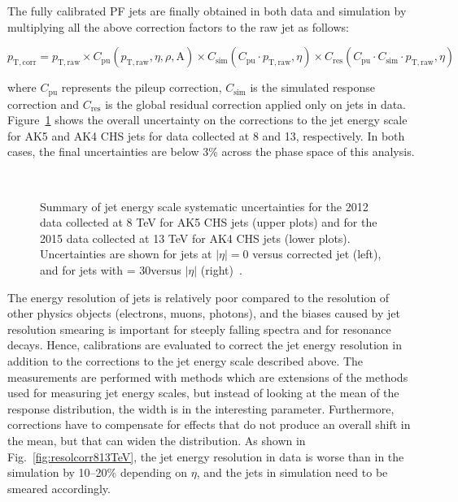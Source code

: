 The fully calibrated PF jets are finally obtained in both data and simulation by multiplying all the above correction factors to the raw jet \pt as follows:

\begin{equation}
p_\mathrm{T,corr} = p_\mathrm{T,raw} \times C_\mathrm{pu}(p_\mathrm{T,raw},\eta,\rho,\mathrm{A}) \times C_\mathrm{sim}(C_\mathrm{pu} \cdot p_\mathrm{T,raw},\eta) \times C_\mathrm{res}(C_\mathrm{pu} \cdot C_\mathrm{sim} \cdot p_\mathrm{T,raw},\eta)
\end{equation}

where $C_\mathrm{pu}$ represents the pileup correction, $C_\mathrm{sim}$ is the simulated response correction and $C_\mathrm{res}$ is the global residual correction applied only on jets in data.
Figure~\ref{fig:jesunc813TeV} shows the overall uncertainty on the corrections to the jet energy scale for AK5 and AK4 CHS jets for data collected at 8 and 13\TeV, respectively. In both cases, the final uncertainties are below 3\% across the phase space of this analysis.

\begin{figure}[!htb]
\centering
{}
\\
\caption{Summary of jet energy scale systematic uncertainties for the 2012 data collected at 8 TeV for AK5 CHS jets (upper plots) and for the 2015 data collected at 13 TeV for AK4 CHS jets (lower plots). Uncertainties are shown for jets at $|\eta| = 0$ versus corrected jet \pt (left), and for jets with \pt = 30\GeV versus $|\eta|$ (right)~\cite{Khachatryan:2016kdb,CMS-DP-2016-020}.}
\label{fig:jesunc813TeV}
\end{figure}

The energy resolution of jets is relatively poor compared to the resolution of other physics objects (electrons, muons, photons), and the biases caused by jet resolution smearing is important for steeply falling spectra and for resonance decays. Hence, calibrations are evaluated to correct the jet energy resolution in addition to the corrections to the jet energy scale described above. The measurements are performed with methods which are extensions of the methods used for measuring jet energy scales, but instead of looking at the mean of the response distribution, the width is in the interesting parameter. Furthermore, corrections have to compensate for effects that do not produce an overall shift in the mean, but that can widen the distribution. As shown in Fig.~\ref{fig:resolcorr813TeV}, the jet energy resolution in data is worse than in the simulation by 10--20\% depending on $\eta$, and the jets in simulation need to be smeared accordingly.

